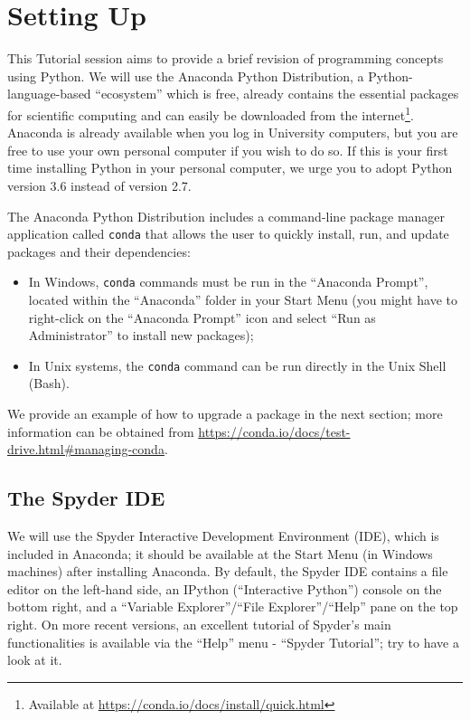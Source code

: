 \section{Setting Up}

This Tutorial session aims to provide a brief revision of programming concepts using Python. We will use the Anaconda Python Distribution, a Python-language-based ``ecosystem'' which is free, already contains the essential packages for scientific computing and can easily be downloaded from the internet\footnote{Available at \url{https://conda.io/docs/install/quick.html}}. Anaconda is already available when you log in University computers, but you are free to use your own personal computer if you wish to do so. If this is your first time installing Python in your personal computer, we urge you to adopt Python version 3.6 instead of version 2.7.

The Anaconda Python Distribution includes a command-line package manager application called {\tt conda} that allows the user to quickly install, run, and update packages and their dependencies:

\begin{itemize}
	\item In Windows, {\tt conda} commands must be run in the ``Anaconda Prompt'', located within the ``Anaconda'' folder in your Start Menu (you might have to right-click on the ``Anaconda Prompt'' icon and select ``Run as Administrator'' to install new packages);
	\item In Unix systems, the {\tt conda} command can be run directly in the Unix Shell (Bash).
\end{itemize}

We provide an example of how to upgrade a package in the next section; more information can be obtained from \url{https://conda.io/docs/test-drive.html#managing-conda}.

\subsection{The Spyder IDE}

We will use the Spyder Interactive Development Environment (IDE), which is included in Anaconda; it should be available at the Start Menu (in Windows machines) after installing Anaconda. By default, the Spyder IDE contains a file editor on the left-hand side, an IPython (``Interactive Python'') console on the bottom right, and a ``Variable Explorer''/``File Explorer''/``Help'' pane on the top right. On more recent versions, an excellent tutorial of Spyder's main functionalities is available via the ``Help'' menu - ``Spyder Tutorial''; try to have a look at it.

